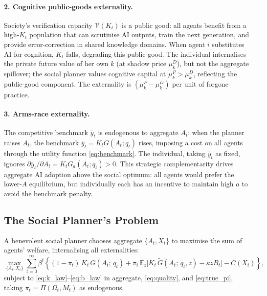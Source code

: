 \documentclass[12pt]{article}
\newcommand{\E}{\mathbb{E}}
\begin{document}
\paragraph{2. Cognitive public-goods externality.} Society's verification capacity
$\mathcal{V}(K_t)$ is a public good: all agents benefit from a high-$K_t$ population
that can scrutinise AI outputs, train the next generation, and provide error-correction
in shared knowledge domains. When agent $i$ substitutes AI for cognition, $K_t$
falls, degrading this public good. The individual internalises the private future
value of her own $k$ (at shadow price $\mu_k^D$), but not the aggregate spillover;
the social planner values cognitive capital at $\mu_k^P > \mu_k^D$, reflecting the
public-good component. The externality is $(\mu_k^P - \mu_k^D)$ per unit of
forgone practice.

\paragraph{3. Arms-race externality.} The competitive benchmark $\bar{y}_t$ is
endogenous to aggregate $A_t$: when the planner raises $A_t$, the benchmark
$\bar{y}_t = K_t G(A_t;q_t)$ rises, imposing a cost on all agents through the
utility function \eqref{eq:benchmark}. The individual, taking $\bar{y}_t$ as
fixed, ignores $\partial\bar{y}_t/\partial A_t = K_t G_a(A_t;q_t) > 0$.
This strategic complementarity drives aggregate AI adoption above the social
optimum: all agents would prefer the lower-$A$ equilibrium, but individually
each has an incentive to maintain high $a$ to avoid the benchmark penalty.

\subsection{The Social Planner's Problem}

A benevolent social planner chooses aggregate $\{A_t, X_t\}$ to maximise the sum
of agents' welfare, internalising all externalities:
\begin{equation}
\max_{\{A_t, X_t\}} \sum_{t=0}^{\infty} \beta^t \left\{
(1-\pi_t)\, K_t\, G(A_t;\, q_t) + \pi_t\,\E_z\bigl[K_t\,\tilde{G}(A_t;\, q_t, z) - \kappa z B_t\bigr] - C(X_t)
\right\},
\label{eq:planner}
\end{equation}
subject to \eqref{eq:k_law}--\eqref{eq:b_law} in aggregate, \eqref{eq:quality},
and \eqref{eq:true_pi}, taking $\pi_t = \Pi(\Omega_t, M_t)$ as endogenous.
\end{document}
